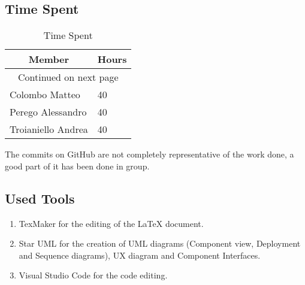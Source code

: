 \subsection{Time Spent}

\begin{center}
\begin{longtable}{|p{8cm} | p{5cm}|}
\hline \multicolumn{1}{|c|}{\textbf{Member}} & \multicolumn{1}{c|}{\textbf{Hours}} \\ \hline 
\endfirsthead
\hline
\endhead
\hline \multicolumn{2}{c}{{Continued on next page}} \\
\endfoot
\hline
\caption{Time Spent}
\label{ref:timespent}
\endlastfoot
Colombo Matteo & 40 \\
\hline 
Perego Alessandro & 40 \\ 
\hline
Troianiello Andrea & 40 \\
\end{longtable}
\end{center}
The commits on GitHub are not completely representative of the work done, a good part of it has been done in group.

\subsection{Used Tools}

\begin{enumerate}
\item
TexMaker for the editing of the LaTeX document.
\item
Star UML for the creation of UML diagrams (Component view, Deployment and Sequence diagrams), UX diagram and Component Interfaces.
\item
Visual Studio Code for the code editing.
\end{enumerate}